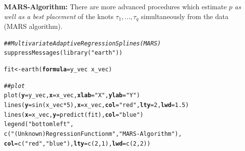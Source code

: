 \documentclass[14pt]{extreport}\usepackage[]{graphicx}\usepackage[]{xcolor}
\makeatletter
\newcommand{\hlnum}[1]{\textcolor[rgb]{0.69,0.494,0}{#1}}%
\newcommand{\hlstr}[1]{\textcolor[rgb]{0.749,0.012,0.012}{#1}}%
\newcommand{\hlcom}[1]{\textcolor[rgb]{0.514,0.506,0.514}{\textit{#1}}}%
\newcommand{\hlopt}[1]{\textcolor[rgb]{0,0,0}{#1}}%
\newcommand{\hlstd}[1]{\textcolor[rgb]{0,0,0}{#1}}%
\newcommand{\hlkwb}[1]{\textcolor[rgb]{0,0.341,0.682}{#1}}%
\newcommand{\hlkwc}[1]{\textcolor[rgb]{0,0,0}{\textbf{#1}}}%
\newcommand{\hlkwd}[1]{\textcolor[rgb]{0.004,0.004,0.506}{#1}}%
\newenvironment{kframe}{%
 \def\at@end@of@kframe{}%
 \ifinner\ifhmode%
  \def\at@end@of@kframe{\end{minipage}}%
  \begin{minipage}{\columnwidth}%
 \fi\fi%
 \def\FrameCommand##1{\hskip\@totalleftmargin \hskip-\fboxsep
 \colorbox{shadecolor}{##1}\hskip-\fboxsep
     \hskip-\linewidth \hskip-\@totalleftmargin \hskip\columnwidth}%
 \MakeFramed {\advance\hsize-\width
   \@totalleftmargin\z@ \linewidth\hsize
   \@setminipage}}%
 {\par\unskip\endMakeFramed%
 \at@end@of@kframe}
\newenvironment{knitrout}{}{} %
\makeatother
\begin{document}
\newpage

\textbf{MARS-Algorithm:} 
There are more advanced procedures which estimate $p$ {\em as well as a best placement} of the
knots $\tau_1,\dots,\tau_q$ simultaneously from the data (MARS algorithm).



\begin{knitrout}
\color{fgcolor}\begin{kframe}
\begin{alltt}
\hlcom{## Multivariate Adaptive Regression Splines (MARS)}
\hlkwd{suppressMessages}\hlstd{(}\hlkwd{library}\hlstd{(}\hlstr{"earth"}\hlstd{))}
\end{alltt}


{\ttfamily\noindent\bfseries{}}\begin{alltt}
\hlstd{fit} \hlkwb{<-} \hlkwd{earth}\hlstd{(}\hlkwc{formula}\hlstd{=y_vec} \hlopt{~} \hlstd{x_vec)}
\end{alltt}


{\ttfamily\noindent\bfseries{}}\begin{alltt}
\hlcom{## plot}
\hlkwd{plot}\hlstd{(}\hlkwc{y}\hlstd{=y_vec,} \hlkwc{x}\hlstd{=x_vec,} \hlkwc{xlab} \hlstd{=} \hlstr{"X"}\hlstd{,} \hlkwc{ylab} \hlstd{=} \hlstr{"Y"}\hlstd{)}
\hlkwd{lines}\hlstd{(}\hlkwc{y}\hlstd{=}\hlkwd{sin}\hlstd{(x_vec} \hlopt{*} \hlnum{5}\hlstd{),} \hlkwc{x}\hlstd{=x_vec,} \hlkwc{col}\hlstd{=}\hlstr{"red"}\hlstd{,} \hlkwc{lty}\hlstd{=}\hlnum{2}\hlstd{,} \hlkwc{lwd}\hlstd{=}\hlnum{1.5}\hlstd{)}
\hlkwd{lines}\hlstd{(}\hlkwc{x}\hlstd{=x_vec,} \hlkwc{y}\hlstd{=}\hlkwd{predict}\hlstd{(fit),} \hlkwc{col}\hlstd{=}\hlstr{"blue"}\hlstd{)}
\hlkwd{legend}\hlstd{(}\hlstr{"bottomleft"}\hlstd{,}
\hlkwd{c}\hlstd{(}\hlstr{"(Unknown) Regression Function m"}\hlstd{,} \hlstr{"MARS-Algorithm"}\hlstd{),}
\hlkwc{col}\hlstd{=}\hlkwd{c}\hlstd{(}\hlstr{"red"}\hlstd{,}\hlstr{"blue"}\hlstd{),} \hlkwc{lty}\hlstd{=}\hlkwd{c}\hlstd{(}\hlnum{2}\hlstd{,}\hlnum{1}\hlstd{),} \hlkwc{lwd}\hlstd{=}\hlkwd{c}\hlstd{(}\hlnum{2}\hlstd{,}\hlnum{2}\hlstd{))}
\end{alltt}
\end{kframe}


\end{knitrout}
\end{document}
